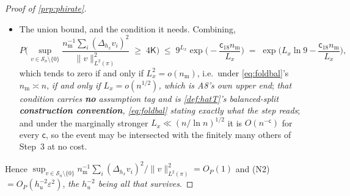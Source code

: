 \begin{proof}[Proof of \cref{prp:phirate}]
\begin{itemize}
\item[--] The union bound, and the condition it needs. Combining,
\[
P\Big(\sup_{v\in\mathcal S_n\setminus\{0\}}\frac{n_{\mathrm m}^{-1}\sum_i(\Delta_{h_x}v_i)^{2}}{\|v\|^{2}_{L^{2}(\pi)}}\;\ge\;4\mathsf K\Big)
\;\le\;9^{L_x}\exp\Big(-\frac{\mathsf c_{18}n_{\mathrm m}}{L_x}\Big)
\;=\;\exp\Big(L_x\ln9-\frac{\mathsf c_{18}n_{\mathrm m}}{L_x}\Big),
\]
which tends to zero if and only if $L_x^{2}=o(n_{\mathrm m})$, i.e.\, under \eqref{eq:foldbal}'s
$n_{\mathrm m}\asymp n$, \emph{if and only if $L_x=o(n^{1/2})$, which is A8's
own upper end}; \emph{that condition carries \textbf{no} assumption tag and is \cref{def:hatT}'s balanced-split
\textbf{construction convention}, \eqref{eq:foldbal} stating exactly what the step reads};
and under the marginally stronger $L_x\ll(n/\ln n)^{1/2}$ it is $O(n^{-\mathsf c})$ for every
$\mathsf c$, so the event may be intersected with the finitely many others of Step~3 at no cost.
\end{itemize}
Hence $\sup_{v\in\mathcal S_n\setminus\{0\}}n_{\mathrm m}^{-1}\sum_i(\Delta_{h_x}v_i)^{2}/\|v\|^{2}_{L^{2}(\pi)}=O_P(1)$
and (N2) $=O_P(h_u^{-2}\varepsilon^{2})$, \emph{the $h_u^{-2}$ being all that survives}.


\end{proof}
